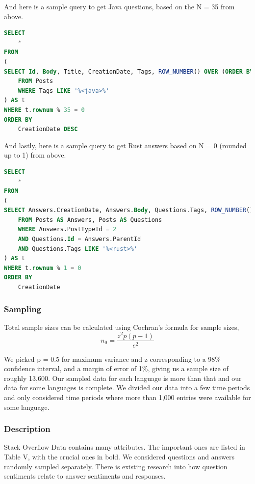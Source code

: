 \documentclass[conference]{IEEEtran}
\begin{document}
And here is a sample query to get Java questions, based on the N = 35 from above.
\begin{lstlisting}[language=SQL]
SELECT
    *
FROM
(
SELECT Id, Body, Title, CreationDate, Tags, ROW_NUMBER() OVER (ORDER BY RAND()) AS rownum
    FROM Posts
    WHERE Tags LIKE '%<java>%'
) AS t
WHERE t.rownum % 35 = 0
ORDER BY
    CreationDate DESC
\end{lstlisting}

And lastly, here is a sample query to get Rust answers based on N = 0 (rounded up to 1) from above.
\begin{lstlisting}[language=SQL]
SELECT
    *
FROM
(
SELECT Answers.CreationDate, Answers.Body, Questions.Tags, ROW_NUMBER() OVER (ORDER BY RAND()) as rownum
    FROM Posts AS Answers, Posts AS Questions
    WHERE Answers.PostTypeId = 2
    AND Questions.Id = Answers.ParentId
    AND Questions.Tags LIKE '%<rust>%'
) AS t
WHERE t.rownum % 1 = 0
ORDER BY
    CreationDate
\end{lstlisting}


\subsubsection{Sampling} Total sample sizes can be calculated using Cochran's formula for sample sizes\cite{b9, b12}, 
\begin{equation}
    n_0 = \frac{z^2p(p-1)}{e^2}
\end{equation}

We picked p = 0.5 for maximum variance and z corresponding to a 98\% confidence interval, and a margin of error of 1\%, giving us a sample size of roughly 13,600. Our sampled data for each language is more than that and our data for some languages is complete. We divided our data into a few time periods and only considered time periods where more than 1,000 entries were available for some language.\\

\subsubsection{Description}
Stack Overflow Data contains many attributes. The important ones are listed in Table V, with the crucial ones in bold. We considered questions and answers randomly sampled separately. There is existing research into how question sentiments relate to answer sentiments and responses\cite{b30, b3}. \\
\end{document}
